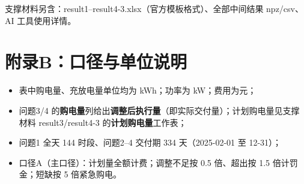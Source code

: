 \documentclass[11pt,a4paper]{ctexart}
\begin{document}
支撑材料另含：result1--result4-3.xlsx（官方模板格式）、全部中间结果 npz/csv、AI 工具使用详情。

\section{附录B：口径与单位说明}
\begin{itemize}
  \item 表中购电量、充放电量单位均为 kWh；功率为 kW；费用为元；
  \item 问题3/4 的\textbf{购电量}列给出\textbf{调整后执行量}（即实际交付量）；计划购电量见支撑材料 result3/result4-3 的\textbf{计划购电量}工作表；
  \item 问题1 全天 144 时段、问题2--4 交付期 334 天（2025-02-01 至 12-31）；
  \item 口径A（主口径）：计划量全额计费；调整不足按 0.5 倍、超出按 1.5 倍计罚金；短缺按 5 倍紧急购电。
\end{itemize}
\end{document}
